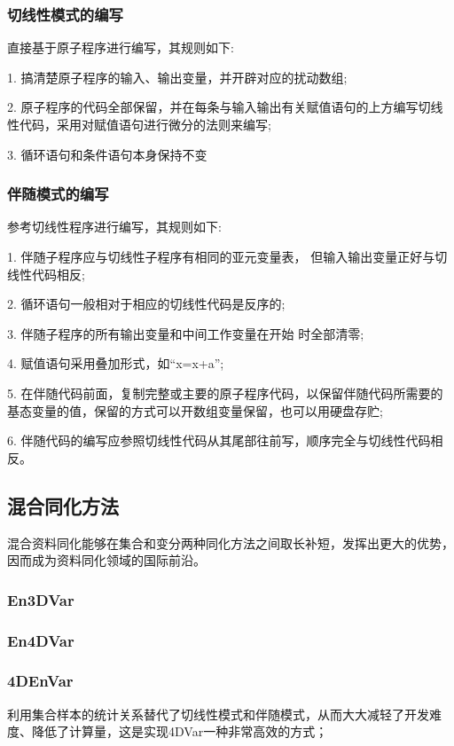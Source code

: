 \documentclass{article}
\begin{document}
\subsubsection{切线性模式的编写}

直接基于原子程序进行编写，其规则如下:

1. 搞清楚原子程序的输入、输出变量，并开辟对应的扰动数组;

2. 原子程序的代码全部保留，并在每条与输入输出有关赋值语句的上方编写切线性代码，采用对赋值语句进行微分的法则来编写;

3. 循环语句和条件语句本身保持不变

\subsubsection{伴随模式的编写}
参考切线性程序进行编写，其规则如下:

1. 伴随子程序应与切线性子程序有相同的亚元变量表，
但输入输出变量正好与切线性代码相反;

2. 循环语句一般相对于相应的切线性代码是反序的;

3. 伴随子程序的所有输出变量和中间工作变量在开始
时全部清零;

4. 赋值语句采用叠加形式，如“x=x+a”;

5. 在伴随代码前面，复制完整或主要的原子程序代码，以保留伴随代码所需要的基态变量的值，保留的方式可以开数组变量保留，也可以用硬盘存贮;

6. 伴随代码的编写应参照切线性代码从其尾部往前写，顺序完全与切线性代码相反。

\subsection{混合同化方法}
混合资料同化能够在集合和变分两种同化方法之间取长补短，发挥出更大的优势，因而成为资料同化领域的国际前沿。

\subsubsection{En3DVar}
\subsubsection{En4DVar}
\subsubsection{4DEnVar}
利用集合样本的统计关系替代了切线性模式和伴随模式，从而大大减轻了开发难度、降低了计算量，这是实现4DVar一种非常高效的方式；
\end{document}
